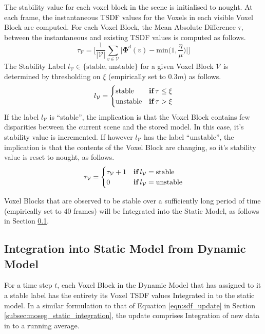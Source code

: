 The stability value for each voxel block in the scene is initialised to nought.
At each frame, the instantaneous TSDF values for the Voxels in each visible
Voxel Block are computed. For each Voxel Block, the Mean Absolute Difference
$\tau$, between the instantaneous and existing TSDF values is computed as
follows.
\begin{equation}
  \label{eqn:moseg_stability_value}
  \tau_{\mathcal{V}} = \Bigg[ \frac{1}{|\mathcal{V}|} \sum_{v \in \mathcal{V}}
  \bigg|\mathbf{\Phi}^{d}(v) - \text{min}\bigg(1, \frac{\eta}{\mu}\bigg)\bigg| \Bigg]
\end{equation}
The Stability Label $l_{\mathcal{V}} \in \{\text{stable}, \text{unstable}\}$ for
a given Voxel Block $\mathcal{V}$ is determined by thresholding on $\xi$
(empirically set to $0.3m$) as follows.
\begin{equation}
  \label{eqn:moseg_stability_labelling}
  l_{\mathcal{V}} =
  \begin{cases}
    \text{stable} & \textbf{if} \mkern4mu \tau \leq \xi \\
    \text{unstable} & \textbf{if} \mkern4mu \tau > \xi
  \end{cases}
\end{equation}
If the label $l_{\mathcal{V}}$ is ``stable'', the implication is that the Voxel
Block contains few disparities between the current scene and the stored model.
In this case, it's stability value is incremented. If however
$l_{\mathcal{V}}$ has the label ``unstable'', the implication is that the
contents of the Voxel Block are changing, so it's stability value is reset to
nought, as follows.
\begin{equation}
  \label{eqn:moseg_stability_update}
  \tau_{\mathcal{V}} =
  \begin{cases}
    \tau_{\mathcal{V}} + 1 & \textbf{if} \mkern4mu l_{\mathcal{V}} =
    \text{stable}\\
    0 & \textbf{if} \mkern4mu l_{\mathcal{V}} = \text{unstable}
  \end{cases}
\end{equation}

Voxel Blocks that are observed to be stable over a sufficiently long period of
time (empirically set to $40$ frames) will be Integrated into the Static Model,
as follows in Section \ref{sub:moseg_static_to_dynamic}.

\subsection{Integration into Static Model from Dynamic Model}
\label{sub:moseg_static_to_dynamic}
For a time step $t$, each Voxel Block in the Dynamic Model that has assigned to
it a stable label has the entirety its Voxel TSDF values Integrated in to the
static model. In a similar formulation to that of Equation \ref{eqn:sdf_update}
in Section \ref{subsec:moseg_static_integration}, the update comprises
Integration of new data in to a running average.

